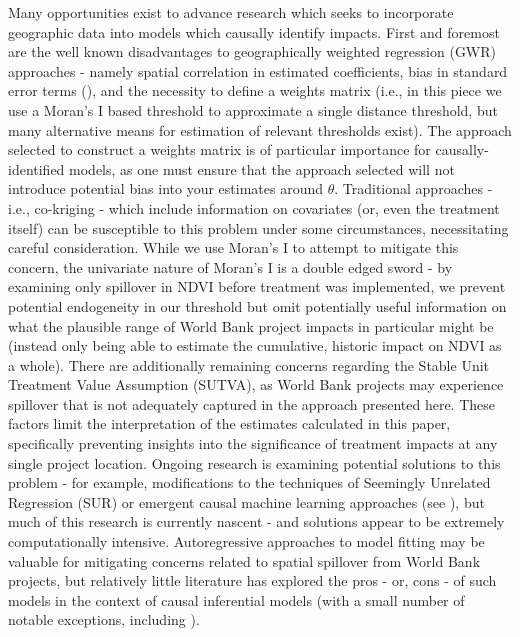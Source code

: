 \documentclass[sustainability,article,submit,moreauthors,pdftex,10pt,a4paper]{mdpi}
\begin{document}
Many opportunities exist to advance research which seeks to incorporate geographic data into models which causally identify impacts. First and foremost are the well known disadvantages to geographically weighted regression (GWR) approaches - namely spatial correlation in estimated coefficients, bias in standard error terms (\cite{wheeler_multicollinearity_2005}), and the necessity to define a weights matrix (i.e., in this piece we use a Moran's I based threshold to approximate a single distance threshold, but many alternative means for estimation of relevant thresholds exist).  The approach selected to construct a weights matrix is of particular importance for causally-identified models, as one must ensure that the approach selected will not introduce potential bias into your estimates around $\theta$. Traditional approaches - i.e., co-kriging - which include information on covariates (or, even the treatment itself) can be susceptible to this problem under some circumstances, necessitating careful consideration. While we use Moran's I to attempt to mitigate this concern, the univariate nature of Moran's I is a double edged sword - by examining only spillover in NDVI before treatment was implemented, we prevent potential endogeneity in our threshold but omit potentially useful information on what the plausible range of World Bank project impacts in particular might be (instead only being able to estimate the cumulative, historic impact on NDVI as a whole). There are additionally remaining concerns regarding the Stable Unit Treatment Value Assumption (SUTVA), as World Bank projects may experience spillover that is not adequately captured in the approach presented here. These factors limit the interpretation of the estimates calculated in this paper, specifically preventing insights into the significance of treatment impacts at any single project location. Ongoing research is examining potential solutions to this problem - for example, modifications to the techniques of Seemingly Unrelated Regression (SUR) or  emergent causal machine learning approaches (see \cite{athey_recursive_2015}), but much of this research is currently nascent - and solutions appear to be extremely computationally intensive.  Autoregressive approaches to model fitting may be valuable for mitigating concerns related to spatial spillover from World Bank projects, but relatively little literature has explored the pros - or, cons - of such models in the context of causal inferential models (with a small number of notable exceptions, including \cite{corrado2012economics}).
\par
\end{document}
